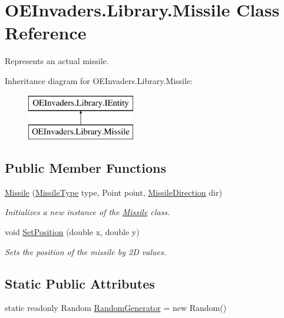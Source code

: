\hypertarget{class_o_e_invaders_1_1_library_1_1_missile}{}\section{O\+E\+Invaders.\+Library.\+Missile Class Reference}
\label{class_o_e_invaders_1_1_library_1_1_missile}


Represents an actual missile.  


Inheritance diagram for O\+E\+Invaders.\+Library.\+Missile\+:\begin{figure}[H]
\begin{center}
\leavevmode
\includegraphics[height=2.000000cm]{class_o_e_invaders_1_1_library_1_1_missile}
\end{center}
\end{figure}
\subsection*{Public Member Functions}
\begin{DoxyCompactItemize}
\item 
\mbox{\hyperlink{class_o_e_invaders_1_1_library_1_1_missile_ae252a2f8992befb6c4bca4b11c40955b}{Missile}} (\mbox{\hyperlink{namespace_o_e_invaders_1_1_library_a54c0ac5ddd321d308d59e807a9a6d83b}{Missile\+Type}} type, Point point, \mbox{\hyperlink{namespace_o_e_invaders_1_1_library_abefe34068a8894fb3391a5f1e315edcd}{Missile\+Direction}} dir)
\begin{DoxyCompactList}\small\item\em Initializes a new instance of the \mbox{\hyperlink{class_o_e_invaders_1_1_library_1_1_missile}{Missile}} class. \end{DoxyCompactList}\item 
void \mbox{\hyperlink{class_o_e_invaders_1_1_library_1_1_missile_a20c94264f05e7eb7b8e72a07b1a849ea}{Set\+Position}} (double x, double y)
\begin{DoxyCompactList}\small\item\em Sets the position of the missile by 2D values. \end{DoxyCompactList}\end{DoxyCompactItemize}
\subsection*{Static Public Attributes}
\begin{DoxyCompactItemize}
\item 
static readonly Random \mbox{\hyperlink{class_o_e_invaders_1_1_library_1_1_missile_a97fb88bef6f6bc3bc8189f07852d6649}{Random\+Generator}} = new Random()
\end{DoxyCompactItemize}
